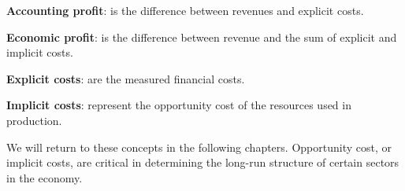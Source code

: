 \begin{DefBox}
\textbf{Accounting profit}: is the difference between revenues and explicit costs. 

\textbf{Economic profit}: is the difference between revenue and the sum of explicit and implicit costs.

\textbf{Explicit costs}: are the measured financial costs.

\textbf{Implicit costs}: represent the opportunity cost of the resources used in production.
\end{DefBox}

We will return to these concepts in the following chapters. Opportunity
cost, or implicit costs, are critical in determining the long-run structure
of certain sectors in the economy.